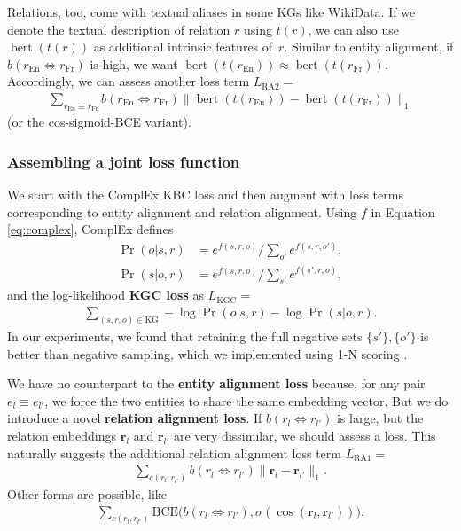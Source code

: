 \documentclass[11pt]{article}
\DeclareMathOperator{\mBERT}{bert}
\def\En{\ensuremath{\text{En}}}
\def\Fr{\ensuremath{\text{Fr}}}
\def\KG{\ensuremath{\text{KG}}}
\begin{document}
Relations, too, come with textual aliases in some KGs like WikiData.    If we denote the textual description of relation $r$ using $t(r)$, we can also use $\mBERT(t(r))$ as additional intrinsic features of~$r$.  Similar to entity alignment, if $b(r_\En \Leftrightarrow r_\Fr)$ is high, we want $\mBERT(t(r_\En)) \approx \mBERT(t(r_\Fr))$.  Accordingly, we can assess another loss term $L_\text{RA2}=$
\begin{align}
\sum_{r_\En \equiv r_\Fr}
b(r_\En \Leftrightarrow r_\Fr)
\big\| \mBERT(t(r_\En)) - \mBERT(t(r_\Fr)) \big\|_1
\end{align}
(or the cos-sigmoid-BCE variant).

\fi

\iffalse
\begin{figure}[ht]
\centering
\texttt{[image: ALIGNKGC\_loss]}
\caption{Joint completion and alignment loss.}
\label{fig:JointLossDesign}
\end{figure}
\fi



\subsubsection{Assembling a joint loss function}

We start with the ComplEx KBC loss and then augment with loss terms corresponding to entity alignment and relation alignment.  Using $f$ in Equation \ref{eq:complex}, ComplEx defines
\begin{align}
\Pr(o|s,r) &= e^{f(s,r,o)} \Big/
\textstyle \sum_{o'} e^{f(s,r,o')}, 
\label{eq:pro} \\
\Pr(s|o,r) &= e^{f(s,r,o)} \Big/
\textstyle \sum_{s'} e^{f(s',r,o)},
\label{eq:prs}
\end{align}
and the log-likelihood \textbf{KGC loss} as
$L_\text{KGC}=$
\begin{multline}
\sum_{(s,r,o)\in\KG}
-\log\Pr(o|s,r)-\log\Pr(s|o,r).
\end{multline}
In our experiments, we found that retaining the full negative sets $\{s'\},\{o'\}$ is better than negative sampling, which we implemented using 1-N scoring \citep{jain-baseline,dettmers2018conve}.

We have no counterpart to the \textbf{entity alignment loss} \citep{Chen+2017MtransE, Sun+2018BootEA} because, for any pair $e_{l} \equiv e_{l'}$, we force the two entities to share the same embedding vector.  But we do introduce a novel \textbf{relation alignment loss}.  If $b(r_{l} \Leftrightarrow r_{l'})$ is large, but the relation embeddings $\bm{r}_{l}$ and $\bm{r}_{l'}$ are very dissimilar, we should assess a loss.  This naturally suggests the additional relation alignment loss term $L_\text{RA1}=$
\begin{align}
\sum_{c(r_{l},r_{l'})}
b(r_{l} \Leftrightarrow r_{l'})
\big\| \bm{r}_{l} - \bm{r}_{l'} \big\|_1.
\end{align}
Other forms are possible, like
\begin{align}
\sum_{c(r_{l},r_{l'})}
\text{BCE}\big( b(r_{l} \Leftrightarrow r_{l'}),
\sigma(\cos(\bm{r}_{l}, \bm{r}_{l'})) \big).
\end{align}
\end{document}
